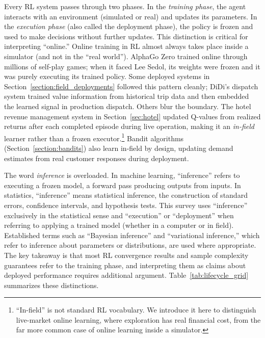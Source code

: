 Every RL system passes through two phases. In the \textit{training phase}, the agent interacts with an environment (simulated or real) and updates its parameters. In the \textit{execution phase} (also called the deployment phase), the policy is frozen and used to make decisions without further updates. This distinction is critical for interpreting ``online.'' Online training in RL almost always takes place inside a simulator (and not in the ``real world''). AlphaGo Zero trained online through millions of self-play games; when it faced Lee Sedol, its weights were frozen and it was purely executing its trained policy. Some deployed systems in Section~\ref{section:field_deployments} followed this pattern cleanly; DiDi's dispatch system trained value information from historical trip data and then embedded the learned signal in production dispatch. Others blur the boundary. The hotel revenue management system in Section~\ref{sec:hotel} updated Q-values from realized returns after each completed episode during live operation, making it an \textit{in-field} learner rather than a frozen executor.\footnote{``In-field'' is not standard RL vocabulary. We introduce it here to distinguish live-market online learning, where exploration has real financial cost, from the far more common case of online learning inside a simulator.} Bandit algorithms (Section~\ref{section:bandits}) also learn in-field by design, updating demand estimates from real customer responses during deployment.

The word \textit{inference} is overloaded. In machine learning, ``inference'' refers to executing a frozen model, a forward pass producing outputs from inputs. In statistics, ``inference'' means statistical inference, the construction of standard errors, confidence intervals, and hypothesis tests. This survey uses ``inference'' exclusively in the statistical sense and ``execution'' or ``deployment'' when referring to applying a trained model (whether in a computer or in field). Established terms such as ``Bayesian inference'' and ``variational inference,'' which refer to inference about parameters or distributions, are used where appropriate. The key takeaway is that most RL convergence results and sample complexity guarantees refer to the training phase, and interpreting them as claims about deployed performance requires additional argument. Table~\ref{tab:lifecycle_grid} summarizes these distinctions.

